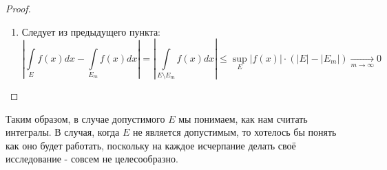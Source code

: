 \documentclass[12pt]{article}
\makeatletter
\newcommand{\MI}{\mathrm{I}}
\newcommand{\VE}{\varepsilon}
\theoremstyle{definition}
\newcommand{\ddint}[2]{\displaystyle\int\limits_{#1}^{#2}}
\renewcommand*\chi{{\@latex@chi\smash[t]{\mathstrut}}} %
\makeatother
\begin{document}
\begin{proof}
\begin{enumerate}[label=\arabic*)]
$$		$$
		$$
			\Rightarrow |E| \leq |E_N| + |\Delta_1| + \dotsc + |\Delta_N| + |\Delta| \leq |E_N| + 2 \VE
		$$
		Поскольку $N$ - произвольное, то:
		$$
			|E| \leq \lim\limits_{N \to \infty}|E_N| + 2\VE \xrightarrow[\VE \to 0]{} \lim\limits_{N \to \infty}|E_N|
		$$
		Заметим, что все это можно было не делать, если бы воспользовались теоремой Лебега (см. далее в курсе). Возьмем $\chi_{E_m}(x)$ и $\chi_E(x)$, $E_m \subset E_{m+1}$ и $\cup_m E_m = E \subset \MI$, где $\MI$ - некоторый брус, тогда:
		$$
			|E_m| = \ddint{\MI}{}\chi_{E_m}(x)dx, \, |E| = \ddint{\MI}{}\chi_E(x)dx
		$$
		$$
			0 \leq \chi_{E_m}(x) \leq 1 \wedge \forall x \in \MI, \, \chi_{E_m}(x) \to \chi_{E}(x)
		$$
		функции индикаторы - ограничены и последнее верно в силу того, что если точка не лежит в $E$, то она не лежит ни в каком $E_m$ и там, и там нули, если лежит в $E$, то верно: 
		$$
			\exists \, k \colon x \in E_k \Rightarrow \forall m > k, \, x \in E_m
		$$
		Теорема Лебега о мажорируемой сходимости даёт нам $|E_m| \to |E|$;
		\item Следует из предыдущего пункта:
		$$
			\left| \ddint{E}{}f(x)dx - \ddint{E_m}{}f(x)dx \right| = \left|\ddint{E\setminus E_m}{}f(x)dx \right| \leq \sup\limits_{E}|f(x)|{\cdot}(|E| - |E_m|) \xrightarrow[m\to \infty]{} 0
		$$
	\end{enumerate}
\end{proof}
Таким образом, в случае допустимого $E$ мы понимаем, как нам считать интегралы. В случая, когда $E$ не является допустимым, то хотелось бы понять как оно будет работать, поскольку на каждое исчерпание делать своё исследование - совсем не целесообразно.
\end{document}
